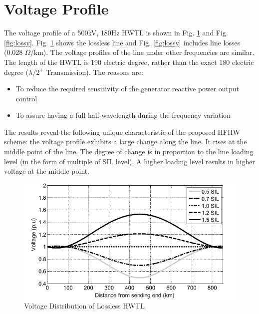 \documentclass[12pt,a4paper]{reportmod}
\begin{document}
\section{Voltage Profile}
\par The voltage profile of a 500kV, 180Hz HWTL is shown in Fig. \ref{fig:lossless} and Fig. \ref{fig:lossy}. Fig. \ref{fig:lossless} shows the lossless line and Fig. \ref{fig:lossy} includes line losses (0.028 $\Omega$/km). The voltage profiles of the line under other frequencies are similar. The length of the HWTL is 190 electric degree, rather than the exact 180 electric degree ($\lambda /2^+$ Transmission). The reasons are:
\begin{itemize}
\item To reduce the required sensitivity of the generator reactive power output control
\item To assure having a full half-wavelength during the frequency variation
\end{itemize}
\par The results reveal the following unique characteristic of the proposed HFHW scheme: the voltage profile exhibits a large change along the line. It rises at the middle point of the line. The degree of change is in proportion to the line loading level (in the form of multiple of SIL level). A higher loading level results in higher voltage at the middle point.
\begin{figure}[h]
\label{fig:lossless}
\begin{center} 
\includegraphics[scale=0.5]{lossless.png}
\caption{Voltage Distribution of Lossless HWTL}
\end{center}
\end{figure}
\end{document}

